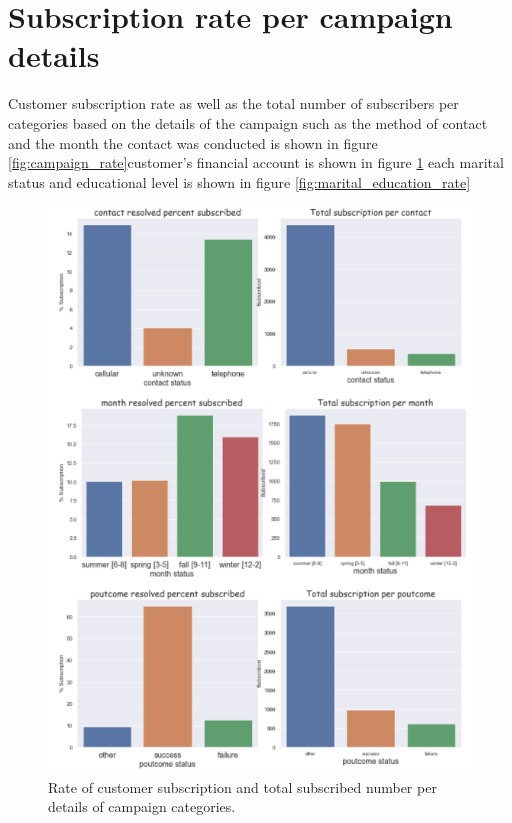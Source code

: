 \section{Subscription rate per campaign details}
Customer subscription rate as well as the total number of subscribers per categories based on the details of the campaign such as the method of contact and the month the contact was conducted is shown in figure \ref{fig:campaign_rate}customer's financial account is shown in figure \ref{} each marital status and educational level is shown in figure \ref{fig:marital_education_rate}
\begin{figure}[tbh]
\centering
\includegraphics[width = 1.0\hsize]{./resources/img/fig_campaign_rate.png}
\caption{Rate of customer subscription and total subscribed number per details of campaign categories.} 
\label{fig:financial_rate}
\end{figure}

